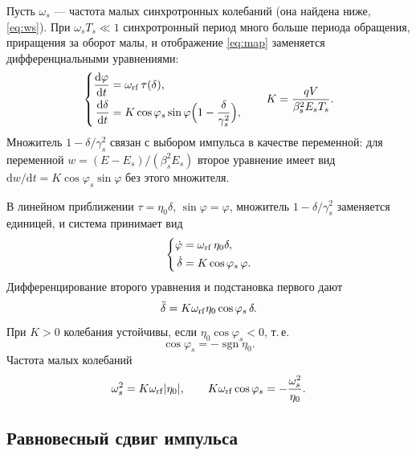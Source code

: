 Пусть $\omega_s$ --- частота малых синхротронных колебаний (она найдена ниже, \eqref{eq:ws}). При $\omega_s T_s\ll 1$ синхротронный период много больше периода обращения, приращения за оборот малы, и отображение \eqref{eq:map} заменяется дифференциальными уравнениями:
\begin{equation}
\label{eq:smooth}
\left\{
\begin{aligned}
\frac{\mathrm{d}\varphi}{\mathrm{d}t}&=\omega_{\mathrm{rf}}\,\tau(\delta),\\
\frac{\mathrm{d}\delta}{\mathrm{d}t}
&=K\cos\varphi_s\sin\varphi\Bigl(1-\frac{\delta}{\gamma_s^2}\Bigr),
\end{aligned}
\right.
\qquad
K=\frac{qV}{\beta_s^2E_sT_s}.
\end{equation}
Множитель $1-\delta/\gamma_s^2$ связан с выбором импульса в качестве переменной: для переменной $w=(E-E_s)/(\beta_s^2E_s)$ второе уравнение имеет вид $\mathrm{d}w/\mathrm{d}t=K\cos\varphi_s\sin\varphi$ без этого множителя.

В линейном приближении $\tau=\eta_0\delta$, $\sin\varphi=\varphi$, множитель $1-\delta/\gamma_s^2$ заменяется единицей, и система принимает вид
\begin{equation}
\label{eq:lin-sys}
\left\{
\begin{aligned}
\dot\varphi&=\omega_{\mathrm{rf}}\,\eta_0\delta,\\
\dot\delta&=K\cos\varphi_s\,\varphi.
\end{aligned}
\right.
\end{equation}
Дифференцирование второго уравнения и подстановка первого дают
\begin{equation}
\label{eq:lin-osc}
\ddot\delta=K\omega_{\mathrm{rf}}\eta_0\cos\varphi_s\,\delta.
\end{equation}
При $K>0$ колебания устойчивы, если $\eta_0\cos\varphi_s<0$, т.\,е.
\begin{equation}
\label{eq:phis}
\cos\varphi_s=-\operatorname{sgn}\eta_0.
\end{equation}
Частота малых колебаний
\begin{equation}
\label{eq:ws}
\omega_s^2=K\omega_{\mathrm{rf}}|\eta_0|,
\qquad
K\omega_{\mathrm{rf}}\cos\varphi_s=-\frac{\omega_s^2}{\eta_0}.
\end{equation}

\subsection{Равновесный сдвиг импульса}

